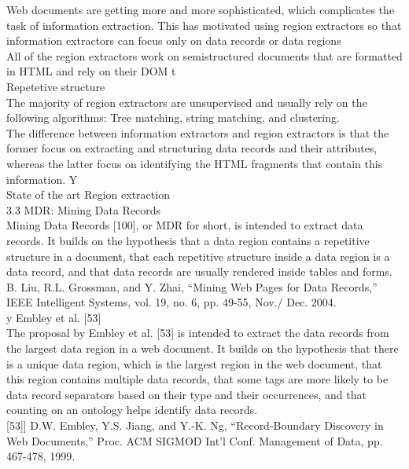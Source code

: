 
Web documents are getting more and more sophisticated,
which complicates the task of information extraction. This
has motivated using region extractors so that information
extractors can focus only on data records or data regions\\

All of the region extractors work on semistructured
documents that are formatted in HTML and rely on
their DOM t\\
Repetetive structure\\
The majority of region extractors are unsupervised
and usually rely on the following algorithms: Tree
matching, string matching, and clustering.\\

 The difference
between information extractors and region extractors is that
the former focus on extracting and structuring data records
and their attributes, whereas the latter focus on identifying
the HTML fragments that contain this information. Y \\

State of the art Region extraction\\
3.3 MDR: Mining Data Records\\
Mining Data Records [100], or MDR for short, is intended to
extract data records. It builds on the hypothesis that a data
region contains a repetitive structure in a document, that
each repetitive structure inside a data region is a data
record, and that data records are usually rendered inside
tables and forms.\\
[100] B. Liu, R.L. Grossman, and Y. Zhai, “Mining Web Pages for Data
Records,” IEEE Intelligent Systems, vol. 19, no. 6, pp. 49-55, Nov./
Dec. 2004.\\

y Embley et al. [53] \\
The proposal by Embley et al. [53] is intended to extract the
data records from the largest data region in a web document.
It builds on the hypothesis that there is a unique data region,
which is the largest region in the web document, that this
region contains multiple data records, that some tags are
more likely to be data record separators based on their
type and their occurrences, and that counting on an
ontology helps identify data records.\\

[53]] D.W. Embley, Y.S. Jiang, and Y.-K. Ng, “Record-Boundary
Discovery in Web Documents,” Proc. ACM SIGMOD Int’l Conf.
Management of Data, pp. 467-478, 1999.\\


